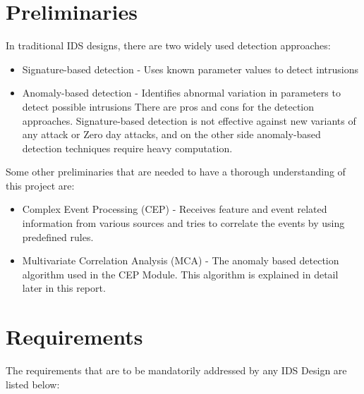 \documentclass[conference]{sig-alternate-05-2015}
\begin{document}
\section{Preliminaries}\label{subsec:preliminaries}
In traditional IDS designs, there are two widely used detection approaches:
\begin{itemize}
  \item Signature-based detection - Uses known parameter values to detect intrusions
  \item Anomaly-based detection - Identifies abnormal variation in parameters to detect possible intrusions 
There are pros and cons for the detection approaches. \newline Signature-based detection is not effective against new variants of any attack or Zero day attacks, and on the other side anomaly-based detection techniques require heavy computation.
\end{itemize}
Some other preliminaries that are needed to have a thorough understanding of this project are:
\begin{itemize}
  \item Complex Event Processing (CEP) - Receives feature and event related information from various sources and tries to correlate the events by using predefined rules.
  \item Multivariate Correlation Analysis (MCA) - The anomaly based detection algorithm used in the CEP Module. This algorithm is explained in detail later in this report.
\end{itemize}

\section{Requirements}\label{subsec:requirements}
The requirements that are to be mandatorily addressed by any IDS Design are listed below:
\end{document}
